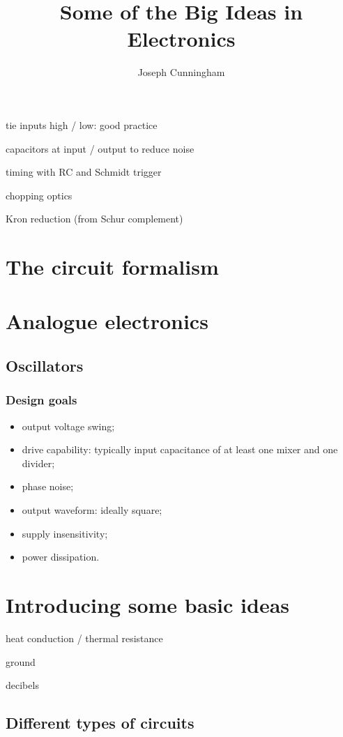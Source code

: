 \documentclass{report}
\title{Some of the Big Ideas in Electronics}
\author{Joseph Cunningham}
\date{}
\begin{document}
\maketitle
\tableofcontents

tie inputs high / low: good practice

capacitors at input / output to reduce noise

timing with RC and Schmidt trigger

chopping optics

Kron reduction (from Schur complement)

\part{The circuit formalism}
\setcounter{chapter}{0} %


\part{Analogue electronics}
\chapter{Oscillators}
\section{Design goals}
\begin{itemize}
\item output voltage swing;
\item drive capability: typically input capacitance of at least one mixer and one divider;
\item phase noise;
\item output waveform: ideally square;
\item supply insensitivity;
\item power dissipation.
\end{itemize}

\part{Introducing some basic ideas}
heat conduction / thermal resistance

ground

decibels


\chapter{Different types of circuits}
\end{document}
